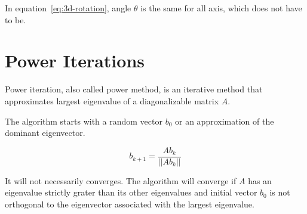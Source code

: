 In equation~\ref{eq:3d-rotation}, angle $\theta$ is the same for all axis, which does not have to be.


\section{Power Iterations}
\label{sec:powerIterations}

Power iteration, also called power method, is an iterative method
that approximates largest eigenvalue of a diagonalizable matrix $A$.

The algorithm starts with a random vector $b_0$ or an approximation of the dominant eigenvector.

\begin{equation}
    \label{eq:powerIterations}
    b_{k+1} = \frac{Ab_k}{||Ab_k||}
\end{equation}

It will not necessarily converges. The algorithm will converge if $A$ has an eigenvalue strictly grater than its other eigenvalues
and initial vector $b_0$ is not orthogonal to the eigenvector associated with the largest eigenvalue.

